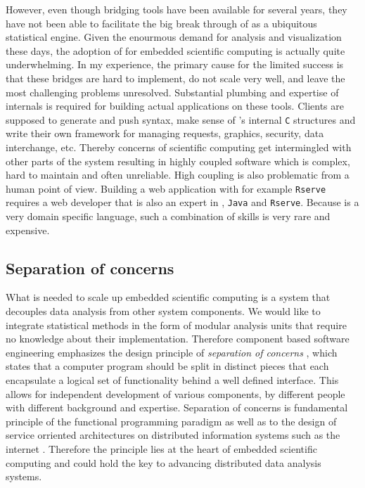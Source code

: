 However, even though bridging tools have been available for several years, they have not been able to facilitate the big break through of \R as a ubiquitous statistical engine. Given the enourmous demand for analysis and visualization these days, the adoption of \R for embedded scientific computing is actually quite underwhelming. In my experience, the primary cause for the limited success is that these bridges are hard to implement, do not scale very well, and leave the most challenging problems unresolved. Substantial plumbing and expertise of \R internals is required for building actual applications on these tools. Clients are supposed to generate and push \R syntax, make sense of \R's internal \texttt{C} structures and write their own framework for managing requests, graphics, security, data interchange, etc. Thereby concerns of scientific computing get intermingled with other parts of the system resulting in highly coupled software which is complex, hard to maintain and often unreliable. High coupling is also problematic from a human point of view. Building a web application with for example \texttt{Rserve} requires a web developer that is also an expert in \R, \texttt{Java} and \texttt{Rserve}. Because \R is a very domain specific language, such a combination of skills is very rare and expensive. 


\subsection{Separation of concerns}

What is needed to scale up embedded scientific computing is a system that decouples data analysis from other system components. We would like to integrate statistical methods in the form of modular analysis units that require no knowledge about their implementation. Therefore component based software engineering emphasizes the design principle of \emph{separation of concerns} \citep{heineman2001component}, which states that a computer program should be split in distinct pieces that each encapsulate a logical set of functionality behind a well defined interface. This allows for independent development of various components, by different people with different background and expertise. Separation of concerns is fundamental principle of the functional programming paradigm \citep{reade1989elements} as well as to the design of service orriented architectures on distributed information systems such as the internet \citep{fielding2000architectural}. Therefore the principle lies at the heart of embedded scientific computing and could hold the key to advancing distributed data analysis systems.

